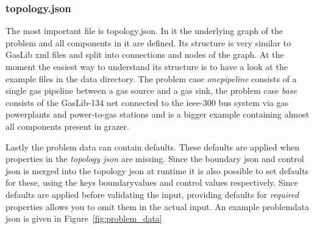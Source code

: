 \documentclass[a4paper]{article}
\newcommand{\sco
}{\textunderscore{}}
\begin{document}
\subsubsection{topology.json}
\label{sec:topology.json}
The most important file is topology.json. In it the underlying graph of the
problem and all components in it are defined. Its structure is very similar to
GasLib xml files and split into connections and nodes of the graph. At the
moment the easiest way to understand its structure is to have a look at the
example files in the data directory. The problem case \emph{one\sco pipeline}
consists of a single gas pipeline between a gas source and a gas sink, the
problem case \emph{base} consists of the GasLib-134 net connected to the
ieee-300 bus system via gas powerplants and power-to-gas stations and is a
bigger example containing almost all components present in grazer.


Lastly the problem data can contain defaults. These defaults are applied when
properties in the \emph{topology json} are missing. Since the boundary json and
control json is merged into the topology json at runtime it is also possible to
set defaults for these, using the keys boundary\sco values and control\sco
values respectively. Since defaults are applied before validating the input,
providing defaults for \emph{required} properties allows you to omit them in the
actual input. An example problem\sco data json is given in Figure~\ref{fig:problem_data}
\end{document}
